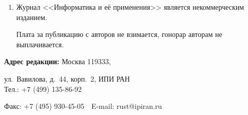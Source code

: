 {{\begin{enumerate}
\begin{itemize}
\item использовать attach (присоединение); %


\item в случае больших объемов информации возможно


использование общеизвестных архиваторов (ZIP, RAR); %


\item в состав электронной версии статьи должны входить: файл, содержащий текст статьи, и файл(ы),


содержащий(е) иллюстрации. %


\end{itemize}


\item Журнал <<Информатика и её применения>> является некоммерческим изданием. 


Плата за публикацию с авторов не взимается, гонорар авторам не выплачивается.


\end{enumerate}


\thispagestyle{empty}


\textbf{Адрес редакции:} Москва 119333,


ул.~Вавилова, д.~44, корп.~2, ИПИ РАН\\


Тел.: +7 (499) 135-86-92\ \


Факс:  +7 (495) 930-45-05\ \  E-mail:   rust@ipiran.ru }


}


